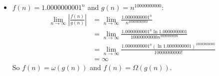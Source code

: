 \documentclass[12pt,twoside]{article}
\begin{document}
\begin{problem}{20}
{\begin{itemize}
	For all $n \equiv 1$ (mod 4), $f(n)/g(n) = 0$, so $f(n) \not= \Omega(g(n))$. Likewise, for all $n \equiv 0$ (mod 4), 
$g(n)/f(n) = 0$, so $f(n) \not= O(g(n))$.  The quotient never converges to some particular limit, so no relation holds.

\item $f(n) = {1.0000000001}^n$ and $g(n) = n^{10000000000}$:
\begin{align*}
   	\lim_{n\to\infty} \left|\frac{f(n)}{g(n)}\right|
	&= \lim_{n\to\infty} \frac{1.0000000001^n}{n^{10000000000}} \\
	&= \lim_{n\to\infty} \frac{1.0000000001^n \ln 1.0000000001}{10000000000n^{9999999999}} \\
	&= \lim_{n\to\infty} \frac{1.0000000001^n (\ln 1.0000000001)^{10000000000}}{10000000000!} \\
	&= \infty
  \end{align*}
	 So $f(n) = \omega(g(n))$ and $f(n) = \Omega(g(n))$.

	
 \end{itemize}

}
\end{problem}
\end{document}
